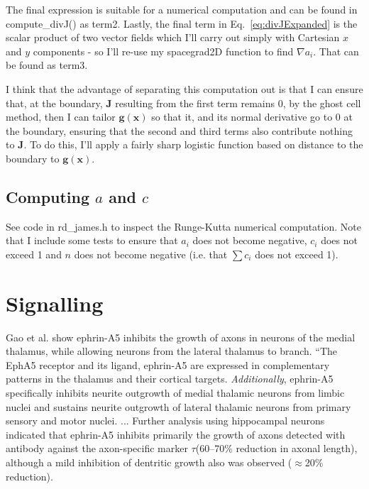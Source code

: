 \documentclass[11pt, a4paper]{article}
\newcommand{\mb}[1]{\mathbf{#1}} %
\newcommand{\code}[1]{\textsf{#1}}
\begin{document}
The final expression is suitable for a numerical computation and can
be found in \code{compute\_divJ()} as \code{term2}. Lastly, the final
term in Eq.~\ref{eq:divJExpanded} is the scalar product of two vector
fields which I'll carry out simply with Cartesian $x$ and $y$
components - so I'll re-use my spacegrad2D function to find $\nabla
a_i$. That can be found as \code{term3}.

I think that the advantage of separating this computation out is that
I can ensure that, at the boundary, $\mb{J}$ resulting from the first
term remains 0, by the ghost cell method, then I can tailor
$\mb{g}(\mb{x})$ so that it, and its normal derivative go to 0 at the
boundary, ensuring that the second and third terms also contribute
nothing to $\mb{J}$. To do this, I'll apply a fairly sharp logistic
function based on distance to the boundary to $\mb{g}(\mb{x})$.

\subsection{Computing $a$ and $c$}

See code in \code{rd\_james.h} to inspect the Runge-Kutta numerical
computation. Note that I include some tests to ensure that $a_i$ does
not become negative, $c_i$ does not exceed 1 and $n$ does not become
negative (i.e. that $\textstyle \sum c_i$ does not exceed 1).


\section {Signalling}

Gao et al. show ephrin-A5 inhibits the growth of axons in neurons of
the medial thalamus, while allowing neurons from the lateral thalamus
to branch. ``The EphA5 receptor and its ligand, ephrin-A5 are
expressed in complementary patterns in the thalamus and their cortical
targets. \emph{Additionally}, ephrin-A5 specifically inhibits neurite
outgrowth of medial thalamic neurons from limbic nuclei and sustains
neurite outgrowth of lateral thalamic neurons from primary sensory and
motor nuclei. ... Further analysis using hippocampal neurons indicated
that ephrin-A5 inhibits primarily the growth of axons detected with
antibody against the axon-specific marker $\tau$(60--70\% reduction in
axonal length), although a mild inhibition of dentritic growth also
was observed ($\approx$20\% reduction).
\end{document}
